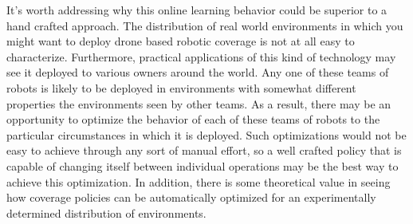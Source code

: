 
It's worth addressing why this online learning behavior could be superior to a hand crafted approach. The distribution of real world environments in which you might want to deploy drone based robotic coverage is not at all easy to characterize. Furthermore, practical applications of this kind of  technology may see it deployed to various owners around the world. Any one of these teams of robots is likely to be deployed in environments with somewhat different properties the environments seen by other teams. As a result, there may be an opportunity to optimize the behavior of each of these teams of robots to the particular circumstances in which it is deployed. Such optimizations would not be easy to achieve through any sort of manual effort, so a well crafted policy that is capable of changing itself between individual operations may be the best way to achieve this optimization. In addition, there is some theoretical value in seeing how coverage policies can be automatically optimized for an experimentally determined distribution of environments.